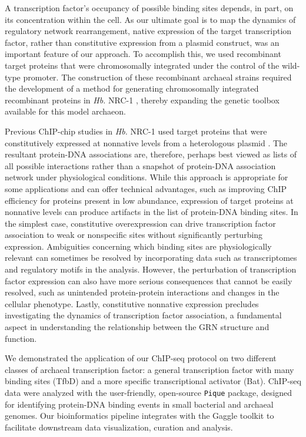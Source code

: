 A transcription factor's occupancy of possible binding sites depends, in part, on its concentration within the cell. As our ultimate goal is to map the dynamics of regulatory network rearrangement, native expression of the target transcription factor, rather than constitutive expression from a plasmid construct, was an important feature of our approach. To accomplish this, we used recombinant target proteins that were chromosomally integrated under the control of the wild-type promoter. The construction of these recombinant archaeal strains required the development of a method for generating chromosomally integrated recombinant proteins in {\em Hb.} NRC-1 , thereby expanding the genetic toolbox available for this model archaeon.

Previous ChIP-chip studies in {\em Hb.} NRC-1 used target proteins that were constitutively expressed at nonnative levels from a heterologous plasmid \cite{facciotti_general_2007, schmid2011two, schmid2009single}. The resultant protein-DNA associations are, therefore, perhaps best viewed as lists of all possible interactions rather than a snapshot of protein-DNA association network under physiological conditions. While this approach is appropriate for some applications and can offer technical advantages, such as improving ChIP efficiency for proteins present in low abundance, expression of target proteins at nonnative levels can produce artifacts in the list of protein-DNA binding sites. In the simplest case, constitutive overexpression can drive transcription factor association to weak or nonspecific sites without significantly perturbing expression. Ambiguities concerning which binding sites are physiologically relevant can sometimes be resolved by incorporating data such as transcriptomes and regulatory motifs in the analysis. However, the perturbation of transcription factor expression can also have more serious consequences that cannot be easily resolved, such as unintended protein-protein interactions and changes in the cellular phenotype. Lastly, constitutive nonnative expression precludes investigating the dynamics of transcription factor association, a fundamental aspect in understanding the relationship between the GRN structure and function.

We demonstrated the application of our ChIP-seq protocol on two different classes of archaeal transcription factor: a general transcription factor with many binding sites (TfbD) and a more specific transcriptional activator (Bat). ChIP-seq data were analyzed with the user-friendly, open-source {\tt Pique} package, designed for identifying protein-DNA binding events in small bacterial and archaeal genomes. Our bioinformatics pipeline integrates with the Gaggle toolkit to facilitate downstream data visualization, curation and analysis.

